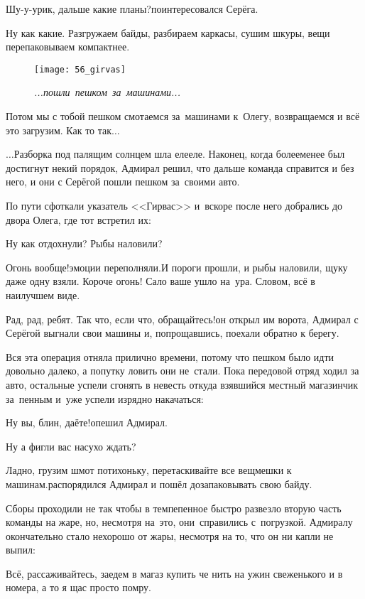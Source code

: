 \diagdash Шу-у-урик, дальше какие планы?\mdash поинтересовался Серёга.

\diagdash Ну как какие. Разгружаем байды, разбираем каркасы, сушим шкуры, вещи перепаковываем компактнее. \begin{wrapfigure}[18]{l}{0.5\textwidth}
	\centering
	\texttt{[image: 56\_girvas]}
	\caption{\small\textit{...пошли~пешком~за~машинами...}}
\end{wrapfigure} Потом мы с тобой пешком смотаемся за~машинами к~Олегу, возвращаемся и всё это загрузим. Как то так$\ldots$

$\ldots$Разборка под палящим солнцем шла еле\sdash еле. Наконец, когда более\sdash менее был достигнут некий порядок, Адмирал решил, что дальше команда справится и без него, и они с Серёгой пошли пешком за~своими авто.

По пути сфоткали указатель <<Гирвас>> и~вскоре после него добрались до двора Олега, где тот встретил их:

\diagdash Ну как отдохнули? Рыбы наловили?

\diagdash Огонь вообще!\mdash эмоции переполняли.\mdash И пороги прошли, и рыбы наловили, щуку даже одну взяли. Короче огонь! Сало ваше ушло на~ура. Словом, всё в наилучшем виде.

\diagdash Рад, рад, ребят. Так что, если что, обращайтесь!\mdash он открыл им ворота, Адмирал с Серёгой выгнали свои машины и, попрощавшись, поехали обратно к берегу.

Вся эта операция отняла прилично времени, потому что пешком было идти довольно далеко, а попутку ловить они не~стали. Пока передовой отряд ходил за авто, остальные успели сгонять в невесть откуда взявшийся местный магазинчик за~пенным и~уже успели изрядно накачаться:

\diagdash Ну вы, блин, даёте!\mdash опешил Адмирал.

\diagdash Ну а фигли вас насухо ждать?

\diagdash Ладно, грузим шмот потихоньку, перетаскивайте все вещмешки к машинам.\mdash распорядился Адмирал и пошёл дозапаковывать свою байду.

Сборы проходили не так чтобы в темпе\mdash пенное быстро развезло вторую часть команды на жаре, но, несмотря на~это, они~справились с~погрузкой. Адмиралу окончательно стало нехорошо от жары, несмотря на то, что он ни капли не выпил:

\diagdash Всё, рассаживайтесь, заедем в магаз купить че нить на ужин свеженького и в номера, а то я щас просто помру.

